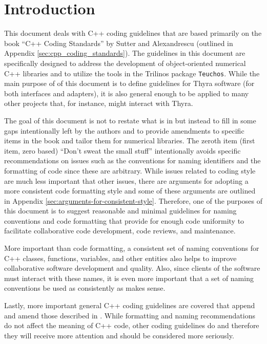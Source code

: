 %
\section{Introduction}
%

This document deals with C++ coding guidelines that are based
primarily on the book ``C++ Coding Standards'' by Sutter and
Alexandrescu {}\cite{C++CodingStandards05} (outlined in Appendix
{}\ref{sec:cpp_coding_standards}).  The guidelines in this document
are specifically designed to address the development of
object-oriented numerical C++ libraries and to utilize the tools in
the Trilinos package {}\texttt{Teuchos}.  While the main purpose of of
this document is to define guidelines for Thyra software (for both
interfaces and adapters), it is also general enough to be applied to
many other projects that, for instance, might interact with Thyra.

The goal of this document is not to restate what is in
{}\cite{C++CodingStandards05} but instead to fill in some gaps
intentionally left by the authors and to provide amendments to
specific items in the book and tailor them for numerical libraries.
The zeroth item (first item, zero based) ``Don't sweat the small
stuff'' intentionally avoids specific recommendations on issues such
as the conventions for naming identifiers and the formatting of code
since these are arbitrary.  While issues related to coding style are
much less important that other issues, there are arguments for
adopting a more consistent code formatting style and some of these
arguments are outlined in Appendix
{}\ref{sec:arguments-for-consistent-style}.  Therefore, one of the
purposes of this document is to suggest reasonable and minimal
guidelines for naming conventions and code formatting that provide for
enough code uniformity to facilitate collaborative code development,
code reviews, and maintenance.

More important than code formatting, a consistent set of naming conventions
for C++ classes, functions, variables, and other entities also helps to
improve collaborative software development and quality.  Also, since clients
of the software must interact with these names, it is even more important that
a set of naming conventions be used as consistently as makes sense.

Lastly, more important general C++ coding guidelines are covered that append
and amend those described in {}\cite{C++CodingStandards05}.  While formatting
and naming recommendations do not affect the meaning of C++ code, other coding
guidelines do and therefore they will receive more attention and should be
considered more seriously.

